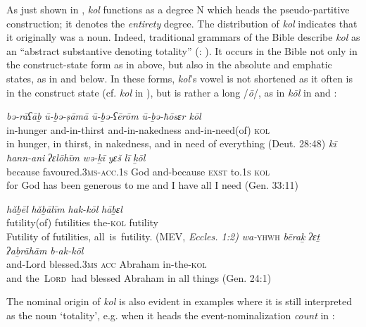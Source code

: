 \documentclass[output=paper]{langsci/langscibook}
\begin{document}
As just shown in , \textit{kol} functions as a degree N which heads the pseudo-partitive construction; it denotes the \textit{entirety} degree. The distribution of \textit{kol} indicates that it originally was a noun. Indeed, traditional grammars of the Bible describe \textit{kol} as an “abstract substantive denoting totality” (\citealt{Joüon1923}: ). It occurs in the Bible not only in the construct-state form as in  above, but also in the absolute and emphatic states, as in  and  below. In these forms, \textit{kol}’s vowel is not shortened as it often is in the construct state (cf. \textit{kol} in ), but is rather a long /\textit{ō}/, as in \textit{kōl} in  and :

\ea%
    \label{ex:doron:11}
    \ea
    \gll \textit{bə-rāʕāḇ}    \textit{ū-ḇə{}-ṣāmā      ū-ḇə{}-ʕērōm            ū-ḇə{}-ħōsɛr         kōl} \\
         in-hunger   and-in-thirst   and-in-nakedness  and-in-need(of)  \textsc{kol}                     \\
    \glt in hunger, in thirst, in nakedness, and in need of everything (Deut. 28:48)
    \ex
    \gll \textit{kī}           \textit{ħann-ani}                      \textit{ʔɛlōhīm}  \textit{wə-ḵī}              \textit{yɛš}    \textit{lī}       \textit{ḵōl}\\
         because favoured.\textsc{3ms-acc.1s}  God        and-because  \textsc{exst} to\textsc{.1s}  \textsc{kol}\\
    \glt for God has been generous to me and I have all I need (Gen. 33:11)
    \z
\z



\ea%
 \label{ex:doron:12}
 \ea
 \gll \textit{hăḇēl}          \textit{hăḇālīm}   \textit{hak-kōl}    \textit{hāḇɛl}\\
      futility(of)  futilities   the-\textsc{kol}  futility \\
 \glt Futility of futilities, all{~}is{~}futility. (MEV, \emph{\textup{Eccles.} \emph{1:2)}}
 \ex
 \gll \textit{wa-}\textsc{yhwh}   \textit{bēraḵ}             \textit{ʔɛṯ}    \textit{ʔaḇrāhām}    \textit{b-ak-kōl}\\
      and-Lord   blessed.\textsc{3ms}   \textsc{acc}  Abraham     in-the-\textsc{kol}\\
 \glt and the~\textsc{\textsc{L}ord}~had blessed Abraham in all things (Gen. 24:1)
 \z
\z

The nominal origin of  \textit{kol} is also evident in examples where it is still interpreted as the noun ‘totality’, e.g. when it heads the event-nominalization \textit{count} in :
\end{document}
